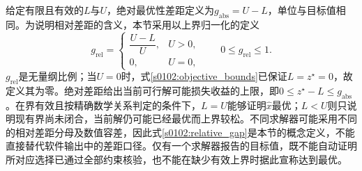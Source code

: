 给定有限且有效的$L$与$U$，绝对最优性差距定义为$g_{\mathrm{abs}}=U-L$，单位与目标值相同。为说明相对差距的含义，本节采用以上界归一化的定义
\begin{equation}
 g_{\mathrm{rel}}=
 \begin{cases}
 \dfrac{U-L}{U},&U>0,\\[4pt]
 0,&U=0,
 \end{cases}
 \qquad 0\leq g_{\mathrm{rel}}\leq1.
 \label{s0102:relative_gap}
\end{equation}
$g_{\mathrm{rel}}$是无量纲比例；当$U=0$时，式\eqref{s0102:objective_bounds}已保证$L=z^\star=0$，故定义其为零。绝对差距给出当前可行解可能损失收益的上限，即$0\leq z^\star-L\leq g_{\mathrm{abs}}$。在界有效且按精确数学关系判定的条件下，$L=U$能够证明$\widehat{x}$最优；$L<U$则只说明现有界尚未闭合，当前解仍可能已经最优而上界较松。不同求解器可能采用不同的相对差距分母及数值容差，因此式\eqref{s0102:relative_gap}是本节的概念定义，不能直接替代软件输出中的差距口径。仅有一个求解器报告的目标值，既不能自动证明所对应选择已通过全部约束核验，也不能在缺少有效上界时据此宣称达到最优。
